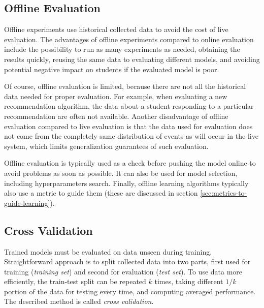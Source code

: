 



\subsection{Offline Evaluation}

Offline experiments use historical collected data
  to avoid the cost of live evaluation.
The advantages of offline experiments compared to online evaluation include
  the possibility to run as many experiments as needed,
  obtaining the results quickly,
  reusing the same data to evaluating different models,
  and avoiding potential negative impact on students if the evaluated model is poor.

Of course, offline evaluation is limited,
  because there are not all the historical data needed
  for proper evaluation.
For example, when evaluating a new recommendation algorithm,
  the data about a student responding to a particular recommendation
  are often not available.
Another disadvantage of offline evaluation compared to live evaluation
  is that the data used for evaluation does not come from the completely
  same distribution of events as will occur in the live system,
  which limits generalization guarantees of such evaluation.

Offline evaluation is typically used as a check before pushing
  the model online to avoid problems as soon as possible.
It can also be used for model selection,
  including hyperparameters search.
Finally, offline learning algorithms typically also use
  a metric to guide them
  (these are discussed in section \ref{sec:metrics-to-guide-learning}).


\subsection{Cross Validation}

Trained models must be evaluated on data unseen during training.
Straightforward approach is to split collected data into two parts,
  first used for training (\emph{training set})
  and second for evaluation (\emph{test set}).
To use data more efficiently, the train-test split can be repeated
  $k$ times, taking different $1/k$ portion of the data for testing every time,
  and computing averaged performance.
The described method is called \emph{cross validation}.

